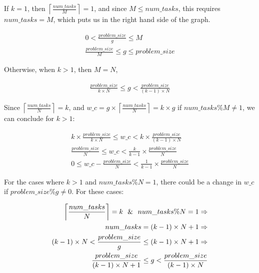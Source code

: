 If $k=1$, then $\left \lceil{\frac{num\_{tasks}}{M}}\right \rceil=1$, and since $M\leq{num\_{tasks}}$, this requires ${num\_{tasks}}=M$, which puts us in the right hand side of the graph. 

\begin{equation}\label{formula9}
\begin{aligned}
0<\frac{problem\_{size}}{g}\leq{M}\\
\frac{problem\_{size}}{M}\leq{g}\leq{problem\_{size}}
\end{aligned}
\end{equation}

Otherwise, when $k>1$, then $M=N$, 

\begin{equation}\label{formula10}
\begin{aligned}
\frac{problem\_{size}}{k\times{N}}\leq{g}<\frac{problem\_{size}}{(k-1)\times{N}}
\end{aligned}
\end{equation}

Since $\left \lceil{\frac{num\_{tasks}}{N}}\right \rceil=k$, and $w\_c={g\times\left \lceil{\frac{num\_{tasks}}{N}}\right \rceil}={k\times{g}}$ if $num\_{tasks}\%{M}\neq{1}$, we can conclude for $k>1$:

\begin{equation}\label{formula11}
\begin{aligned}
k\times{\frac{problem\_{size}}{k\times{N}}}\leq{w\_c}<{k\times{\frac{problem\_{size}}{(k-1)\times{N}}}}\\
\frac{problem\_{size}}{{N}}\leq{w\_c}<{\frac{k}{k-1}\times{\frac{problem\_{size}}{N}}}\\
0\leq{w\_c-\frac{problem\_{size}}{N}}<\frac{1}{k-1}\times{\frac{problem\_{size}}{N}}
\end{aligned}
\end{equation}

For the cases where $k>1$ and $num\_{tasks}\%{N}={1}$, there could be a  change in $w\_c$ if $problem\_{size}\%{g}\neq{0}$. For these cases:


\begin{equation}\label{formula15}
\begin{aligned}
\left \lceil{\frac{num\_{tasks}}{N}}\right \rceil=k \text{\:\:\:}\&\text{\:\:\:} num\_{tasks}\%{N}={1}\Rightarrow\\
num\_{tasks}=(k-1)\times{N}+1\Rightarrow\\
(k-1)\times{N}<{\frac{problem\_{size}}{g}}\leq(k-1)\times{N}+1\Rightarrow\\
\frac{problem\_{size}}{(k-1)\times{N}+1}\leq{g}<\frac{problem\_{size}}{(k-1)\times{N}}
\end{aligned}
\end{equation}


